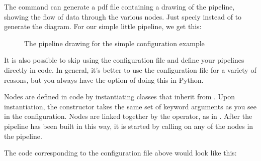 \documentclass[letterpaper,10pt,english]{sphinxmanual}
\let\sphinxpxdimen\pdfpxdimen\else\newdimen\sphinxpxdimen
\begin{document}
%
\begin{sphinxVerbatim}[commandchars=\\\{\}]
  \PYG{p}{[}  \PYG{p}{]}  
\end{sphinxVerbatim}

The  command can generate a pdf file containing a drawing of the pipeline, showing the flow of data through the various nodes. Just speciy  instead of  to generate the diagram. For our simple little pipeline, we get this:

\begin{figure}[htbp]
\centering
\capstart

\noindent\sphinxincludegraphics[width=240\sphinxpxdimen]{{sample_config_drawing}.pdf}
\caption{The pipeline drawing for the simple configuration example}\label{\detokenize{treehorn:id3}}\end{figure}

It is also possible to skip using the configuration file and define your
pipelines directly in code. In general, it’s better to use the configuration
file for a variety of reasons, but you always have the option of doing this
in Python.

Nodes are defined in code by instantiating classes that inherit from
. Upon instantiation, the constructor takes the same set of
keyword arguments as you see in the configuration. Nodes are linked together
by the \sphinxcode{\sphinxupquote{\textgreater{}}} operator, as in . After the pipeline has been
built in this way, it is started by calling  on any
of the nodes in the pipeline.

The code corresponding to the configuration file above would look like this:
\end{document}
